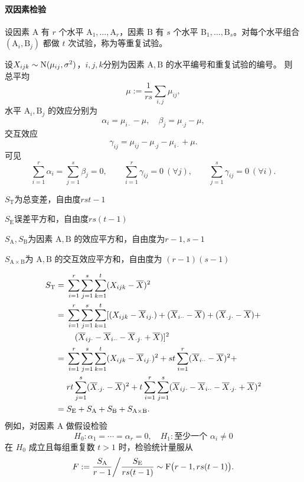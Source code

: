 \paragraph{双因素检验}
设因素 $\mathrm A$ 有 $r$ 个水平 $\mathrm A_1,\ldots,\mathrm A_r$，因素 $\mathrm B$ 有 $s$ 个水平 $\mathrm B_1,\ldots,\mathrm B_s$。对每个水平组合 $(\mathrm A_i,\mathrm B_j)$ 都做 $t$ 次试验，称为等重复试验。

设$X_{ijk} \sim \operatorname{N}(\mu_{ij},\sigma^2)$，$i, j, k $分别为因素 $\mathrm A,\mathrm B$ 的水平编号和重复试验的编号。
则
总平均
\[
	\mu := \frac1{rs}\sum_{i,j}\mu_{ij},
\]
水平 $\mathrm A_i,\mathrm B_j$ 的效应分别为
\begin{equation}\label{eq:ps-main-effects}
	\alpha_i = \mu_{i\cdot} - \mu,\quad\beta_j = \mu_{\cdot j} - \mu,
\end{equation}
交互效应
\begin{equation}\label{eq:ps-interaction-effect}
	\gamma_{ij} = \mu_{ij} - \mu_{\cdot j} - \mu_{i\cdot} + \mu.
\end{equation}
可见
\[
	\sum_{i=1}^r\alpha_i = \sum_{j=1}^s\beta_j = 0,
	\qquad \sum_{i=1}^r\gamma_{ij} = 0\ (\forall j),
	\qquad \sum_{j=1}^s\gamma_{ij} = 0\ (\forall i).
\]
\begin{compactitem}
	\item $S_{\mathrm T}$为总变差，自由度$rst - 1$
	\item $S_{\mathrm E}$误差平方和，自由度$rs(t - 1)$
	\item $S_{\mathrm A},S_{\mathrm B}$为因素 $\mathrm A,\mathrm B$ 的效应平方和，自由度为$ r - 1, s - 1$
	\item $S_{\mathrm A\times\mathrm B}$为 $\mathrm A,\mathrm B$ 的交互效应平方和，自由度为 $(r - 1)(s - 1)$
\end{compactitem}
\begin{align}
	\notag
	S_{\mathrm T} = {}& \sum_{i=1}^r \sum_{j=1}^s \sum_{k=1}^t(X_{i j k} - \overline{X})^2 \\
	\notag
	= {}& \sum_{i=1}^r \sum_{j=1}^s \sum_{k=1}^t[(X_{i j k} - \overline{X}_{i j \cdot}) + (\overline{X}_{i\cdot\cdot} - \overline{X}) + (\overline{X}_{\cdot j \cdot} - \overline{X}) +\\
	\notag
	&\quad(\overline{X}_{i j \cdot} - \overline{X}_{i \cdot\cdot} - \overline{X}_{\cdot j \cdot} + \overline{X})]^2 \\
	\notag
	= {}& \sum_{i=1}^r \sum_{j=1}^s \sum_{k=1}^t(X_{i j k} - \overline{X}_{i j \cdot})^2 + s t \sum_{i=1}^r(\overline{X}_{i\cdot\cdot} - \overline{X})^2 + \\
	\notag
	& r t \sum_{j=1}^s(\overline{X}_{\cdot j \cdot} - \overline{X})^2 + t \sum_{i=1}^r \sum_{j=1}^s(\overline{X}_{i j \cdot} - \overline{X}_{i\cdot\cdot} - \overline{X}_{\cdot j \cdot} + \overline{X})^2\\
	= {}&S_{\mathrm E} + S_{\mathrm A} + S_{\mathrm B} + S_{\mathrm A\times\mathrm B}.
\end{align}
例如，对因素 $\mathrm A$ 做假设检验
\[
	H_0:\alpha_1 = \cdots = \alpha_r = 0,\quad H_1:\text{至少一个 }\alpha_i \ne 0
\]
在 $H_0$ 成立且每组重复数 $t > 1$ 时，检验统计量服从
\begin{equation}\label{eq:ps-two-way-f-test}
	F := {\frac{S_{\mathrm A}}{r - 1}}\bigg/{\frac{S_{\mathrm E}}{rs(t - 1)}} \sim \operatorname{F}\bigl(r - 1,rs(t - 1)\bigr).
\end{equation}


